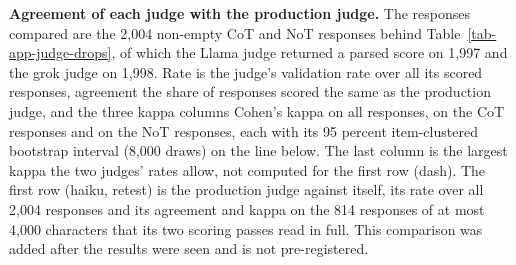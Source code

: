 \begin{table}[t]
\centering
\small
\caption{\textbf{Agreement of each judge with the production judge.} The
responses compared are the 2,004
non-empty CoT and NoT responses behind Table~\ref{tab-app-judge-drops}, of
which the Llama judge returned a parsed score on 1,997 and the grok judge on
1,998.
Rate is the judge's validation rate over all its scored responses, agreement
the share of responses scored the same as the production judge, and the
three kappa columns Cohen's kappa on all responses, on the CoT responses and
on the NoT responses, each with its 95 percent item-clustered bootstrap
interval (8,000 draws) on the line below. The last column is the largest
kappa the two judges' rates allow, not computed for the first row (dash).
The first row (haiku, retest) is the production judge against itself, its rate over
all 2,004 responses and its agreement and kappa on the 814 responses of at
most 4,000 characters that its two scoring passes read in full. This
comparison was added after the results were seen and is not pre-registered.}
\label{tab-app-interjudge}

\end{table}

